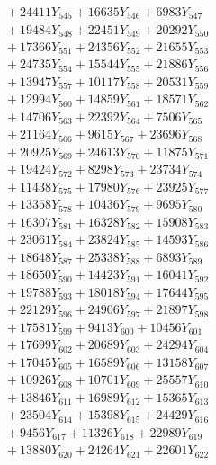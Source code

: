 \documentclass[a4paper,10pt]{article}
\begin{document}
{\begin{align}
&\;  + 24411 Y_{545} + 16635 Y_{546} + 6983 Y_{547} \\[0.3ex]
&\;  + 19484 Y_{548} + 22451 Y_{549} + 20292 Y_{550} \\[0.3ex]
&\;  + 17366 Y_{551} + 24356 Y_{552} + 21655 Y_{553} \\[0.3ex]
&\;  + 24735 Y_{554} + 15544 Y_{555} + 21886 Y_{556} \\[0.3ex]
&\;  + 13947 Y_{557} + 10117 Y_{558} + 20531 Y_{559} \\[0.3ex]
&\;  + 12994 Y_{560} + 14859 Y_{561} + 18571 Y_{562} \\[0.3ex]
&\;  + 14706 Y_{563} + 22392 Y_{564} + 7506 Y_{565} \\[0.3ex]
&\;  + 21164 Y_{566} + 9615 Y_{567} + 23696 Y_{568} \\[0.5ex]\allowbreak
&\;  + 20925 Y_{569} + 24613 Y_{570} + 11875 Y_{571} \\[0.3ex]
&\;  + 19424 Y_{572} + 8298 Y_{573} + 23734 Y_{574} \\[0.3ex]
&\;  + 11438 Y_{575} + 17980 Y_{576} + 23925 Y_{577} \\[0.3ex]
&\;  + 13358 Y_{578} + 10436 Y_{579} + 9695 Y_{580} \\[0.3ex]
&\;  + 16307 Y_{581} + 16328 Y_{582} + 15908 Y_{583} \\[0.3ex]
&\;  + 23061 Y_{584} + 23824 Y_{585} + 14593 Y_{586} \\[0.3ex]
&\;  + 18648 Y_{587} + 25338 Y_{588} + 6893 Y_{589} \\[0.3ex]
&\;  + 18650 Y_{590} + 14423 Y_{591} + 16041 Y_{592} \\[0.3ex]
&\;  + 19788 Y_{593} + 18018 Y_{594} + 17644 Y_{595} \\[0.3ex]
&\;  + 22129 Y_{596} + 24906 Y_{597} + 21897 Y_{598} \\[0.5ex]\allowbreak
&\;  + 17581 Y_{599} + 9413 Y_{600} + 10456 Y_{601} \\[0.3ex]
&\;  + 17699 Y_{602} + 20689 Y_{603} + 24294 Y_{604} \\[0.3ex]
&\;  + 17045 Y_{605} + 16589 Y_{606} + 13158 Y_{607} \\[0.3ex]
&\;  + 10926 Y_{608} + 10701 Y_{609} + 25557 Y_{610} \\[0.3ex]
&\;  + 13846 Y_{611} + 16989 Y_{612} + 15365 Y_{613} \\[0.3ex]
&\;  + 23504 Y_{614} + 15398 Y_{615} + 24429 Y_{616} \\[0.3ex]
&\;  + 9456 Y_{617} + 11326 Y_{618} + 22989 Y_{619} \\[0.3ex]
&\;  + 13880 Y_{620} + 24264 Y_{621} + 22601 Y_{622} \\[0.3ex]

\end{align}}
\end{document}

